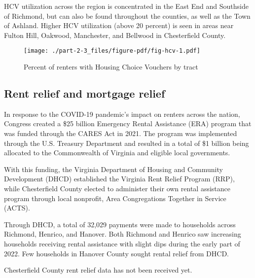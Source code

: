 \documentclass[
  letterpaper,
  DIV=11,
  numbers=noendperiod]{scrreprt}
\begin{document}
HCV utilization across the region is concentrated in the East End and
Southside of Richmond, but can also be found throughout the counties, as
well as the Town of Ashland. Higher HCV utilization (above 20 percent)
is seen in areas near Fulton Hill, Oakwood, Manchester, and Bellwood in
Chesterfield County.

\begin{figure}

{\centering \texttt{[image: ./part-2-3\_files/figure-pdf/fig-hcv-1.pdf]}

}

\caption{\label{fig-hcv}Percent of renters with Housing Choice Vouchers
by tract}

\end{figure}

\hypertarget{rent-relief-and-mortgage-relief}{%
\subsection{Rent relief and mortgage
relief}\label{rent-relief-and-mortgage-relief}}

In response to the COVID-19 pandemic's impact on renters across the
nation, Congress created a \$25 billion Emergency Rental Assistance
(ERA) program that was funded through the CARES Act in 2021. The program
was implemented through the U.S. Treasury Department and resulted in a
total of \$1 billion being allocated to the Commonwealth of Virginia and
eligible local governments.

With this funding, the Virginia Department of Housing and Community
Development (DHCD) established the Virginia Rent Relief Program (RRP),
while Chesterfield County elected to administer their own rental
assistance program through local nonprofit, Area Congregations Together
in Service (ACTS).

Through DHCD, a total of 32,029 payments were made to households across
Richmond, Henrico, and Hanover. Both Richmond and Henrico saw increasing
households receiving rental assistance with slight dips during the early
part of 2022. Few households in Hanover County sought rental relief from
DHCD.

\begin{tcolorbox}[enhanced jigsaw, colframe=quarto-callout-warning-color-frame, arc=.35mm, bottomrule=.15mm, colbacktitle=quarto-callout-warning-color!10!white, opacityback=0, left=2mm, rightrule=.15mm, title=\textcolor{quarto-callout-warning-color}{\faExclamationTriangle}\hspace{0.5em}{All data not available}, colback=white, coltitle=black, toptitle=1mm, leftrule=.75mm, titlerule=0mm, breakable, opacitybacktitle=0.6, toprule=.15mm, bottomtitle=1mm]

Chesterfield County rent relief data has not been received yet.

\end{tcolorbox}
\end{document}
